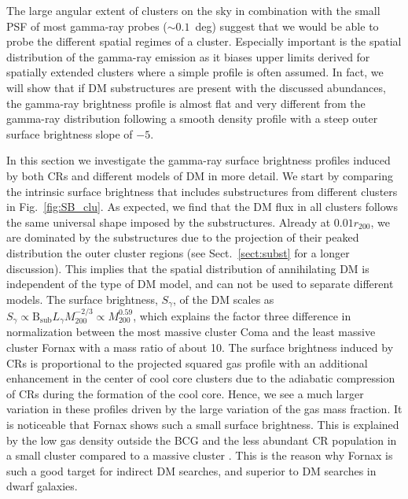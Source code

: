 \documentclass[10pt,aps,pra,reprint,amsmath,amsfonts,amssymb,showpacs,nofootinbib,floatfix]{revtex4-1}
\def\del#1{{}}
\newcommand{\rmn}{\mathrm}
\newcommand{\B}{\rmn{B}}
\newcommand{\bsub}{\B_\rmn{sub}}
\newcommand{\rvir}{r_{200}}
\newcommand{\mvir}{M_{200}}
\begin{document}
The large angular extent of clusters on the sky in combination with
the small PSF of most gamma-ray probes ($\sim 0.1$~deg) suggest that
we would be able to probe the different spatial regimes of a
cluster. Especially important is the spatial distribution of the
gamma-ray emission as it biases upper limits derived for spatially
extended clusters where a simple profile is often assumed. In fact, we
will show that if DM substructures are present with the discussed
abundances, the gamma-ray brightness profile is almost flat and very
different from the gamma-ray distribution following a smooth density
profile with a steep outer surface brightness slope of $-5$.

In this section we investigate the gamma-ray surface brightness
profiles induced by both CRs and different models of DM in more
detail. We start by comparing the intrinsic surface brightness that
includes substructures from different clusters in
Fig.~\ref{fig:SB_clu}. As expected, we find that the DM flux in all
clusters follows the same universal shape imposed by the
substructures. Already at $0.01\rvir$, we are dominated by the
substructures due to the projection of their peaked distribution the
outer cluster regions (see Sect.~\ref{sect:subst} for a longer
discussion). This implies that the spatial distribution of
annihilating DM is independent of the type of DM model, and can not be
used to separate different models. The surface brightness, $S_\gamma$,
of the DM scales as $S_\gamma\propto\bsub L_{\gamma} \mvir^{-2/3}
\propto \mvir^{0.59}$, which explains the factor three difference in
normalization between the most massive cluster Coma and the least
massive cluster Fornax with a mass ratio of about 10. \del{The flux
  from the LP model shows a smaller spread in the normalization which
  is due to the additional contribution from SFE with a negative mass
  trend, hence a flux normalization with a softer mass-scaling of
  $S_\gamma\propto\mvir^{0.06}$.} The surface brightness induced by
CRs is proportional to the projected squared gas profile with an
additional enhancement in the center of cool core clusters due to the
adiabatic compression of CRs during the formation of the cool
core. Hence, we see a much larger variation in these profiles driven
by the large variation of the gas mass fraction. It is noticeable that
Fornax shows such a small surface brightness. This is explained by the
low gas density outside the BCG and the less abundant CR population in
a small cluster compared to a massive cluster
\cite{2010MNRAS.409..449P}.  This is the reason why Fornax is such a
good target for indirect DM searches, and superior to DM searches in
dwarf galaxies.
\end{document}

